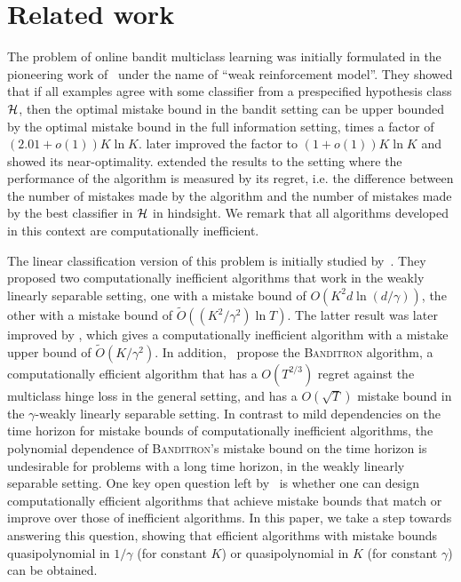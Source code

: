 \section{Related work}
\label{section:related-work}

The problem of online bandit multiclass learning was initially formulated in the
pioneering work of~\citet{Auer-Long-1999} under the name of ``weak reinforcement
model''. They showed that if all examples agree with some classifier from a
prespecified hypothesis class $\mathcal{H}$, then the optimal mistake bound in the
bandit setting can be upper bounded by the optimal mistake bound in the full
information setting, times a factor of $(2.01 + o(1))K \ln K$. \citet{Long-2017}
later improved the factor to $(1 + o(1)) K \ln K$ and showed its
near-optimality. \citet{Daniely-Helbertal-2013} extended the results to the
setting where the performance of the algorithm is measured by its regret, i.e.
the difference between the number of mistakes made by the algorithm and the
number of mistakes made by the best classifier in $\mathcal{H}$ in hindsight. We
remark that all algorithms developed in this context are computationally
inefficient.

The linear classification version of this problem is initially studied
by~\citet{Kakade-Shalev-Shwartz-Tewari-2008}. They proposed two computationally
inefficient algorithms that work in the weakly linearly separable setting, one
with a mistake bound of $O(K^2 d \ln(d/\gamma))$, the other with a mistake bound
of $\widetilde{O}((K^2/\gamma^2) \ln T)$. The latter result was later improved
by \citet{Daniely-Helbertal-2013}, which gives a computationally inefficient
algorithm with a mistake upper bound of $\widetilde{O}(K/\gamma^2)$. In
addition,~\citet{Kakade-Shalev-Shwartz-Tewari-2008} propose the
\textsc{Banditron} algorithm, a computationally efficient algorithm that has a
$O(T^{2/3})$ regret against the multiclass hinge loss in the general setting,
and has a $O(\sqrt{T})$ mistake bound in the $\gamma$-weakly linearly separable
setting. In contrast to mild dependencies on the time horizon for mistake bounds
of computationally inefficient algorithms, the polynomial dependence of
\textsc{Banditron}'s mistake bound on the time horizon is undesirable for
problems with a long time horizon, in the weakly linearly separable setting. One
key open question left by~\citet{Kakade-Shalev-Shwartz-Tewari-2008} is whether
one can design computationally efficient algorithms that achieve mistake bounds
that match or improve over those of inefficient algorithms. In this paper, we
take a step towards answering this question, showing that efficient algorithms
with mistake bounds quasipolynomial in $1/\gamma$ (for constant $K$) or
quasipolynomial in $K$ (for constant $\gamma$) can be obtained.

